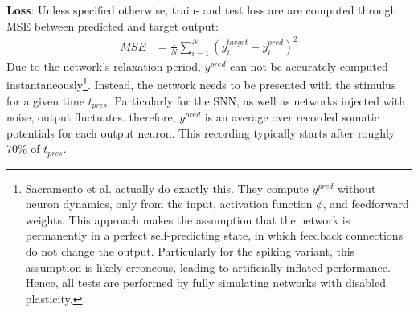 \textbf{Loss}: Unless specified otherwise, train- and test loss are are computed through MSE between
predicted and target output:
\begin{align*}
  MSE &= \frac{1}{N} \sum_{i=1}^N \left( y^{target}_i-y^{pred}_i \right)^2
\end{align*}
Due to the network's relaxation period, $y^{pred}$ can not be accurately computed instantaneously\footnote{Sacramento et
al. actually do exactly this. They compute $y^{pred}$ without neuron dynamics, only from the input, activation function
$\phi$, and feedforward weights. This approach makes the assumption that the network is permanently in a perfect
self-predicting state, in which feedback connections do not change the output. Particularly for the spiking variant,
this assumption is likely erroneous, leading to artificially inflated performance. Hence, all tests are performed by
fully simulating networks with disabled plasticity.}. Instead, the network needs to be presented with the stimulus for a
given time $t_{pres}$. Particularly for the SNN, as well as networks injected with noise, output fluctuates. therefore,
$y^{pred}$ is an average over recorded somatic potentials for each output neuron. This recording typically starts after
roughly $70\%$ of $t_{pres}$. 